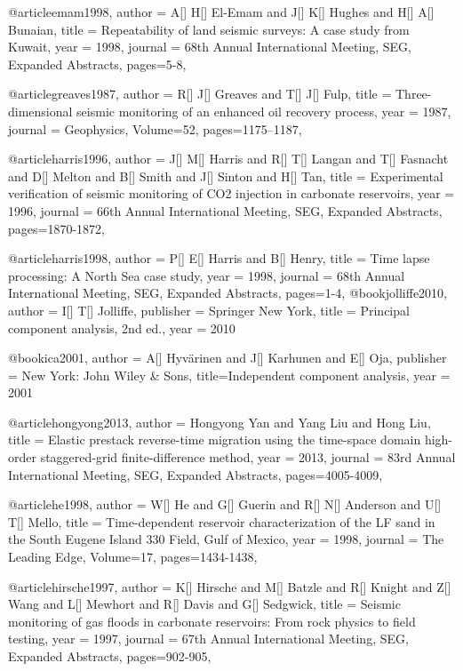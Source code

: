 @article{emam1998,
  author =	 {A[] H[] El-Emam and J[] K[] Hughes and H[] A[] Bunaian},
  title =	 {Repeatability of land seismic surveys: A case study from Kuwait},
  year =	 1998,
  journal =	 {68th Annual International Meeting, SEG, Expanded Abstracts},
 pages=5-8,
}


@article{greaves1987,
  author =	 {R[] J[] Greaves and T[] J[] Fulp},
  title =	 {Three-dimensional seismic monitoring of an enhanced oil recovery process},
  year =	 1987,
  journal =	 {Geophysics},
    Volume=52,
 pages=1175–1187,
}

@article{harris1996,
  author =	 {J[] M[] Harris and R[] T[] Langan and T[] Fasnacht and D[] Melton and B[] Smith and J[] Sinton and H[] Tan},
  title =	 {Experimental verification of seismic monitoring of CO2 injection in carbonate reservoirs},
  year =	 1996,
  journal =	 {66th Annual International Meeting, SEG, Expanded Abstracts},
 pages=1870-1872,
}

@article{harris1998,
  author =	 {P[] E[] Harris and B[] Henry},
  title =	 {Time lapse processing: A North Sea case study},
  year =	 1998,
  journal =	 {68th Annual International Meeting, SEG, Expanded Abstracts},
 pages=1-4,
}
@book{jolliffe2010,
   author =       {I[] T[] Jolliffe},
   publisher =    {Springer New York},
   title =        {Principal component analysis, 2nd ed.},
   year =         {2010}
}

@book{ica2001,
   author =       {A[] Hyv\"{a}rinen  and J[] Karhunen and E[] Oja},
   publisher =    {New York: John Wiley \& Sons},
   title={Independent component analysis},
   year =         {2001}
}


@article{hongyong2013,
  author =	 {Hongyong Yan and Yang Liu and Hong Liu},
  title =	 {Elastic prestack reverse-time migration using the time-space domain high-order staggered-grid finite-difference method},
  year =	 2013,
  journal =	 {83rd Annual International Meeting, SEG, Expanded Abstracts},
 pages=4005-4009,
}

@article{he1998,
  author =	 {W[] He and G[] Guerin and R[] N[] Anderson and U[] T[] Mello},
  title =	 {Time-dependent reservoir characterization of the LF sand in the South Eugene Island 330 Field, Gulf of Mexico},
  year =	 1998,
  journal =	 {The Leading Edge},
    Volume=17,
 pages=1434-1438,
}

@article{hirsche1997,
  author =	 {K[] Hirsche and M[] Batzle and R[] Knight and Z[] Wang and L[] Mewhort and R[] Davis and G[] Sedgwick},
  title =	 {Seismic monitoring of gas floods in carbonate reservoirs: From rock physics to field testing},
  year =	 1997,
  journal =	 {67th Annual International Meeting, SEG, Expanded Abstracts},
 pages=902-905,
}

